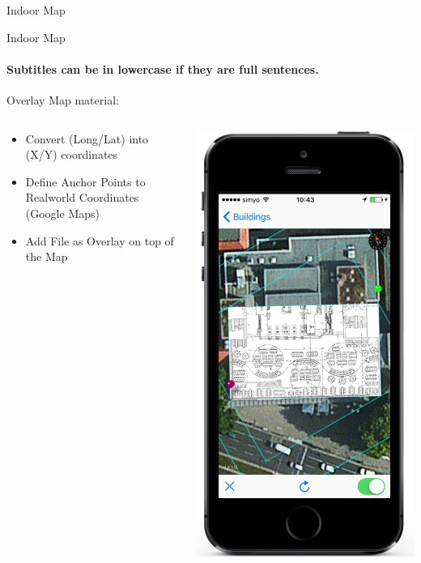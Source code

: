 \documentclass[11pt]{beamer}
\begin{document}
\begin{frame}{Indoor Map}
\end{frame}


\begin{frame}{Indoor Map}

\framesubtitle{Subtitles can be in lowercase if they are full sentences.}
Overlay Map material:

  \begin{columns}[T]
  \begin{column}{.6\textwidth}
  \begin{itemize}
    \item Convert (Long/Lat) into (X/Y) coordinates
    \item Define Anchor Points to Realworld Coordinates (Google Maps)
    \item Add File as Overlay on top of the Map
  \end{itemize}
  \end{column}
  \begin{column}{.4\textwidth}
  \includegraphics[scale=0.25]{mapsecondstep}

\end{column}
\end{columns}
\end{frame}
\end{document}

